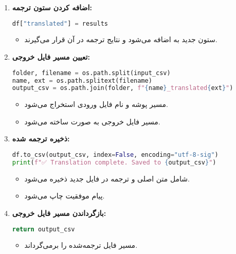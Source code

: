\documentclass{article}
\begin{document}
\begin{enumerate}
    \item \textbf{اضافه کردن ستون ترجمه:}
    \begin{latin}
    \begin{lstlisting}[language=Python]
df["translated"] = results
    \end{lstlisting}
    \end{latin}
    \begin{itemize}
        \item ستون جدید  به  اضافه می‌شود و نتایج ترجمه در آن قرار می‌گیرند.
    \end{itemize}

    \item \textbf{تعیین مسیر فایل خروجی:}
    \begin{latin}
    \begin{lstlisting}[language=Python]
folder, filename = os.path.split(input_csv)
name, ext = os.path.splitext(filename)
output_csv = os.path.join(folder, f"{name}_translated{ext}")
    \end{lstlisting}
    \end{latin}
    \begin{itemize}
        \item مسیر پوشه و نام فایل ورودی استخراج می‌شود.
        \item مسیر فایل خروجی به صورت  ساخته می‌شود.
    \end{itemize}

    \item \textbf{ذخیره  ترجمه شده:}
    \begin{latin}
    \begin{lstlisting}[language=Python]
df.to_csv(output_csv, index=False, encoding="utf-8-sig")
print(f"✅ Translation complete. Saved to {output_csv}")
    \end{lstlisting}
    \end{latin}
    \begin{itemize}
        \item {} شامل متن اصلی و ترجمه در فایل جدید ذخیره می‌شود.
        \item پیام موفقیت چاپ می‌شود.
    \end{itemize}

    \item \textbf{بازگرداندن مسیر فایل خروجی:}
    \begin{latin}
    \begin{lstlisting}[language=Python]
return output_csv
    \end{lstlisting}
    \end{latin}
    \begin{itemize}
        \item مسیر فایل  ترجمه‌شده را برمی‌گرداند.
    \end{itemize}
\end{enumerate}
\end{document}
